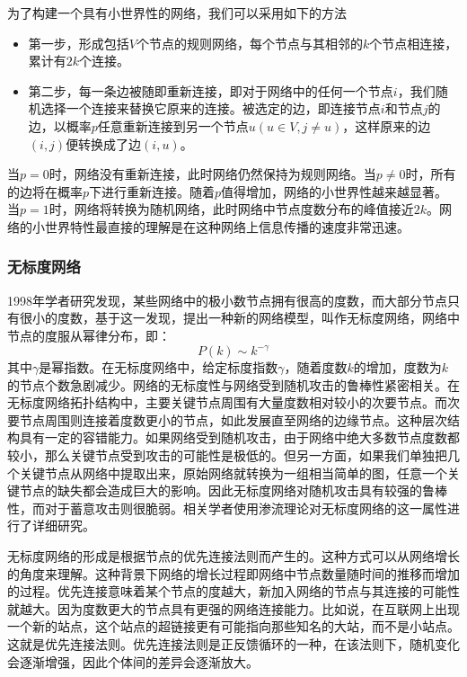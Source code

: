 \documentclass{ctexart}
\begin{document}
                为了构建一个具有小世界性的网络，我们可以采用如下的方法
                \begin{itemize}
                    \item 第一步，形成包括$V$个节点的规则网络，每个节点与其相邻的$k$个节点相连接，累计有$2k$个连接。
                    \item 第二步，每一条边被随即重新连接，即对于网络中的任何一个节点$i$，我们随机选择一个连接来替换它原来的连接。被选定的边，即连接节点$i$和节点$j$的边，以概率$p$任意重新连接到另一个节点$u(u\in V,j\ne u)$，这样原来的边$(i,j)$便转换成了边$(i,u)$。
                \end{itemize}
                当$p=0$时，网络没有重新连接，此时网络仍然保持为规则网络。当$p\ne 0$时，所有的边将在概率$p$下进行重新连接。随着$p$值得增加，网络的小世界性越来越显著。当$p=1$时，网络将转换为随机网络，此时网络中节点度数分布的峰值接近$2k$。网络的小世界特性最直接的理解是在这种网络上信息传播的速度非常迅速。

            \subsubsection{无标度网络}
                1998年学者研究发现，某些网络中的极小数节点拥有很高的度数，而大部分节点只有很小的度数，基于这一发现，提出一种新的网络模型，叫作无标度网络，网络中节点的度服从幂律分布，即：
                \begin{equation}
                    P(k) \sim k^{-\gamma}
                \end{equation}
                其中$\gamma$是幂指数。在无标度网络中，给定标度指数$\gamma$，随着度数$k$的增加，度数为$k$的节点个数急剧减少。网络的无标度性与网络受到随机攻击的鲁棒性紧密相关。在无标度网络拓扑结构中，主要关键节点周围有大量度数相对较小的次要节点。而次要节点周围则连接着度数更小的节点，如此发展直至网络的边缘节点。这种层次结构具有一定的容错能力。如果网络受到随机攻击，由于网络中绝大多数节点度数都较小，那么关键节点受到攻击的可能性是极低的。但另一方面，如果我们单独把几个关键节点从网络中提取出来，原始网络就转换为一组相当简单的图，任意一个关键节点的缺失都会造成巨大的影响。因此无标度网络对随机攻击具有较强的鲁棒性，而对于蓄意攻击则很脆弱。相关学者使用渗流理论对无标度网络的这一属性进行了详细研究。

                无标度网络的形成是根据节点的优先连接法则而产生的。这种方式可以从网络增长的角度来理解。这种背景下网络的增长过程即网络中节点数量随时间的推移而增加的过程。优先连接意味着某个节点的度越大，新加入网络的节点与其连接的可能性就越大。因为度数更大的节点具有更强的网络连接能力。比如说，在互联网上出现一个新的站点，这个站点的超链接更有可能指向那些知名的大站，而不是小站点。这就是优先连接法则。优先连接法则是正反馈循环的一种，在该法则下，随机变化会逐渐增强，因此个体间的差异会逐渐放大。
\end{document}
